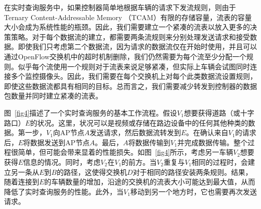 在实时查询服务中，如果控制器简单地根据车辆的请求下发流规则，则由于Ternary Content-Addressable Memory （TCAM）有限的存储容量，流表的容量大小会成为系统性能的瓶颈。因此，我们需要建立一个紧凑的流表以放入更多的决策策略。对于每个数据流的建立，都需要两条流规则来分别处理发送请求和接受数据。即使我们只考虑第二个数据流，因为请求的数据流仅在开始时使用，并且可以通过OpenFlow交换机中的超时机制删除，我们仍然需要为每个流至少分配一个规则。似乎每个流使用一个规则对于流表来说足够紧凑，但实际上车辆会试图同时连接多个监控摄像头。因此，我们需要在每个交换机上对每个此类数据流设置规则，即使这些数据流都具有相同的目标。总而言之，我们需要减少转发到控制器的数据包数量并同时建立紧凑的流表。


图~\ref{fig4}描述了一个实时查询服务的基本工作流程。假设$V_{1}$想要获得道路（或十字路口）$E$的状况。这里，状况可以是视频或存储在路边设备中的任何其他种类的数据。第一步，$V_{1}$向AP节点$A$发送请求，然后数据流转发到$E$。在确认来自$V_{1}$的请求后，$E$将数据发送到AP节点$A$。最后，$A$将数据传输到$V_{1}$并完成数据传输。整个过程很简单，但可能会带来显着的性能损失。如图~\ref{fig4}所示，考虑另一车辆$V_{2}$想要获得$E$信息的情况。同时，考虑$V_{2}$在$V_{1}$的前方。当$V_{2}$重复与$V_{1}$相同的过程时，会建立另一条从$E$到$B$的路径，这使得交换机$D$对于相同的路径安装两条规则。结果，随着连接到$E$的车辆数量的增加，沿途的交换机的流表大小可能达到最大值，从而降低了实时查询服务的性能。此外，当$V_{1}$移动到另一个地方时，它也需要再次发送请求。

